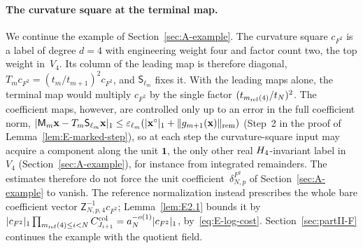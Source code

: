 \paragraph{The curvature square at the terminal map.} We continue the example of Section~\ref{sec:A-example}. The curvature square $c_{F^2}$ is a label of degree $d=4$ with engineering weight four and factor count two, the top weight in~$V_4$. Its column of the leading map is therefore diagonal, $T_mc_{F^2}=(t_m/t_{m+1})^2c_{F^2}$, and $\mathsf S_{\ell_m}$ fixes it. With the leading maps alone, the terminal map would multiply $c_{F^2}$ by the single factor $(t_{m_{\mathrm{ref}}(4)}/t_N)^2$. The coefficient maps, however, are controlled only up to an error in the full coefficient norm, $|\mathsf M_m\mathbf x-T_m\mathsf S_{\ell_m}\mathbf x|_1\le\varepsilon_{\ell_m}(|\mathbf x^\circ|_1+\|g_{m+1}(\mathbf x)\|_{\rm rem})$ (Step~2 in the proof of Lemma~\ref{lem:E-marked-step}), so at each step the curvature-square input may acquire a component along the unit $\mathbf1$, the only other real $H_4$-invariant label in~$V_4$ (Section~\ref{sec:A-example}), for instance from integrated remainders. The estimates therefore do not force the unit coefficient~$\delta^{F^2}_{N,p}$ of Section~\ref{sec:A-example} to vanish. The reference normalization instead prescribes the whole bare coefficient vector $\mathsf Z_{N,p,4}^{-1}c_{F^2}$; Lemma~\ref{lem:E2.1} bounds it by $|c_{F^2}|_1\prod_{m_{\mathrm{ref}}(4)\le i<N}C^{\rm col}_{J_{i+1}}=a_N^{-o(1)}|c_{F^2}|_1$, by~\eqref{eq:E-log-cost}. Section~\ref{sec:partII-F} continues the example with the quotient field.

